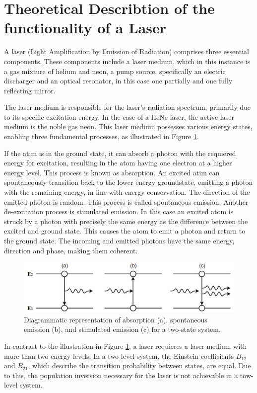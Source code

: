 \section{Theoretical Describtion of the functionality of a Laser}
\label{sec:theory}

A laser (Light Amplification by Emission of Radiation) comprises
three essential components. These components include a laser medium, 
which in this instance is a gas mixture of helium and neon, a pump
source, specifically an electric discharger and an optical resonator, 
in this case one partially and one fully reflecting mirror.

The laser medium is responsible for the laser's radiation spectrum, 
primarily due to its specific excitation energy. In the case 
of a HeNe laser, the active laser medium is the noble gas neon. 
This laser medium possesses various energy states, enabling three 
fundamental processes, as illustrated in Figure \ref{fig:emission}.

If the atim is in the ground state, it can absorb a photon with 
the requiered energy for excitation, resulting in the atom having 
one electron at a higher energy level. This process is known as 
absorption. An excited atim can spontaneously transition back 
to the lower energy groundstate, emitting a photon with the remaining 
energy, in line with energy conservation. The direction of the emitted
photon is random. This process is called spontaneous emission.
Another de-excitation process is stimulated emission. In this case
an excited atom is struck by a photon with precisely the same 
energy as the difference between the excited and ground state. 
This causes the atom to emit a photon and return to the ground state.
The incoming and emitted photons have the same energy, direction and 
phase, making them coherent.

\begin{figure}
    \centering
    \includegraphics[width=0.8\linewidth]{pictures/emission.png}
    \caption{Diagrammatic representation of absorption (a), spontaneous emission (b), and stimulated emission (c) for a two-state system.}
    \label{fig:emission}
\end{figure}

In contrast to the illustration in Figure \ref{fig:emission}, a laser 
requieres a laser medium with more than two energy levels. In a two 
level system, the Einstein coefficients $B_{12}$ and $B_{21}$, which 
describe the transition probability between states, are equal. Due to 
this, the population inversion necessary for the laser is not achievable
in a tow-level system.

